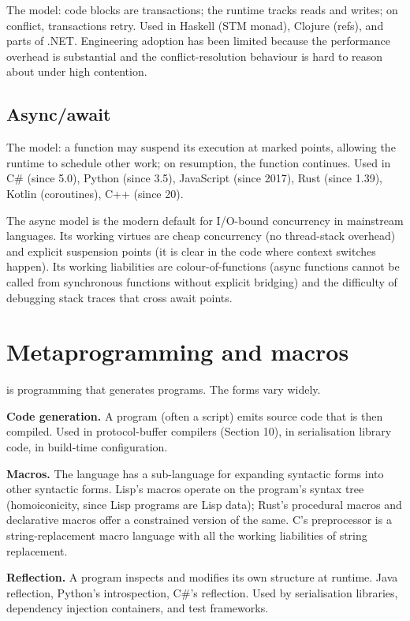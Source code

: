 The model: code blocks are transactions; the runtime tracks reads and writes; on conflict, transactions retry. Used in Haskell (STM monad), Clojure (refs), and parts of .NET. Engineering adoption has been limited because the performance overhead is substantial and the conflict-resolution behaviour is hard to reason about under high contention.

\subsection{Async/await}

The model: a function may suspend its execution at marked points, allowing the runtime to schedule other work; on resumption, the function continues. Used in C\# (since 5.0), Python (since 3.5), JavaScript (since 2017), Rust (since 1.39), Kotlin (coroutines), C++ (since 20).

The async model is the modern default for I/O-bound concurrency in mainstream languages. Its working virtues are cheap concurrency (no thread-stack overhead) and explicit suspension points (it is clear in the code where context switches happen). Its working liabilities are colour-of-functions (async functions cannot be called from synchronous functions without explicit bridging) and the difficulty of debugging stack traces that cross await points.

\section{Metaprogramming and macros}

 is programming that generates programs. The forms vary widely.

\textbf{Code generation.} A program (often a script) emits source code that is then compiled. Used in protocol-buffer compilers (Section 10), in serialisation library code, in build-time configuration.

\textbf{Macros.} The language has a sub-language for expanding syntactic forms into other syntactic forms. Lisp's macros operate on the program's syntax tree (homoiconicity, since Lisp programs are Lisp data); Rust's procedural macros and declarative macros offer a constrained version of the same. C's preprocessor is a string-replacement macro language with all the working liabilities of string replacement.

\textbf{Reflection.} A program inspects and modifies its own structure at runtime. Java reflection, Python's introspection, C\#'s reflection. Used by serialisation libraries, dependency injection containers, and test frameworks.

